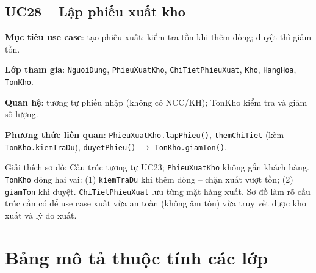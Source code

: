 \subsection{UC28 -- Lập phiếu xuất kho}

\textbf{Mục tiêu use case}: tạo phiếu xuất; kiểm tra tồn khi thêm dòng; duyệt thì giảm tồn.

\textbf{Lớp tham gia}: \texttt{NguoiDung}, \texttt{PhieuXuatKho}, \texttt{ChiTietPhieuXuat}, \texttt{Kho}, \texttt{HangHoa}, \texttt{TonKho}.

\textbf{Quan hệ}: tương tự phiếu nhập (không có NCC/KH); TonKho kiểm tra và giảm số lượng.

\textbf{Phương thức liên quan}: \texttt{PhieuXuatKho.lapPhieu()}, \texttt{themChiTiet} (kèm \texttt{TonKho.kiemTraDu}), \texttt{duyetPhieu()} $\rightarrow$ \texttt{TonKho.giamTon()}.



Giải thích sơ đồ: Cấu trúc tương tự UC23; \texttt{PhieuXuatKho} không gắn khách hàng. \texttt{TonKho} đóng hai vai: (1) \texttt{kiemTraDu} khi thêm dòng -- chặn xuất vượt tồn; (2) \texttt{giamTon} khi duyệt. \texttt{ChiTietPhieuXuat} lưu từng mặt hàng xuất. Sơ đồ làm rõ cấu trúc cần có để use case xuất vừa an toàn (không âm tồn) vừa truy vết được kho xuất và lý do xuất.

\section{Bảng mô tả thuộc tính các lớp}

